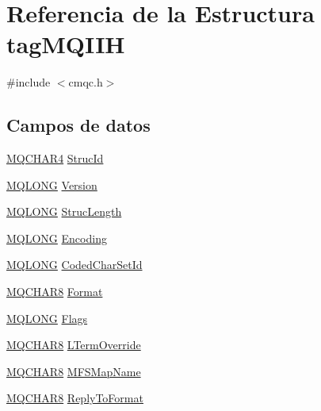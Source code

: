 \hypertarget{structtag_m_q_i_i_h}{}\section{Referencia de la Estructura tag\+M\+Q\+I\+I\+H}
\label{structtag_m_q_i_i_h}


{\ttfamily \#include $<$cmqc.\+h$>$}

\subsection*{Campos de datos}
\begin{DoxyCompactItemize}
\item 
\hyperlink{cmqc_8h_a12590e546ed66fda7cf21c1d5cefa31d}{M\+Q\+C\+H\+A\+R4} \hyperlink{structtag_m_q_i_i_h_a0530922ca944569b52601d74941f96e4}{Struc\+Id}
\item 
\hyperlink{cmqc_8h_a1fb8d28cbda3fa8766a9821230cdb6d5}{M\+Q\+L\+O\+N\+G} \hyperlink{structtag_m_q_i_i_h_a0656ef8f766b3907d394d88a35d7b7e9}{Version}
\item 
\hyperlink{cmqc_8h_a1fb8d28cbda3fa8766a9821230cdb6d5}{M\+Q\+L\+O\+N\+G} \hyperlink{structtag_m_q_i_i_h_a830af9a4a08c015b9a4b2d39d4d3420a}{Struc\+Length}
\item 
\hyperlink{cmqc_8h_a1fb8d28cbda3fa8766a9821230cdb6d5}{M\+Q\+L\+O\+N\+G} \hyperlink{structtag_m_q_i_i_h_a30167bf454a49a60fd3fe4e9e586af34}{Encoding}
\item 
\hyperlink{cmqc_8h_a1fb8d28cbda3fa8766a9821230cdb6d5}{M\+Q\+L\+O\+N\+G} \hyperlink{structtag_m_q_i_i_h_a4d8d1961a991850d1355cdf9b4680b8e}{Coded\+Char\+Set\+Id}
\item 
\hyperlink{cmqc_8h_abddcedb8c41fa262f2bd05dfec3e60a5}{M\+Q\+C\+H\+A\+R8} \hyperlink{structtag_m_q_i_i_h_a435a478822008713f8aaff89f369ed63}{Format}
\item 
\hyperlink{cmqc_8h_a1fb8d28cbda3fa8766a9821230cdb6d5}{M\+Q\+L\+O\+N\+G} \hyperlink{structtag_m_q_i_i_h_a8da770267273b200fa9c968fa2a0da57}{Flags}
\item 
\hyperlink{cmqc_8h_abddcedb8c41fa262f2bd05dfec3e60a5}{M\+Q\+C\+H\+A\+R8} \hyperlink{structtag_m_q_i_i_h_a6234d3d27d3b6ffe0efc51f8bd845f79}{L\+Term\+Override}
\item 
\hyperlink{cmqc_8h_abddcedb8c41fa262f2bd05dfec3e60a5}{M\+Q\+C\+H\+A\+R8} \hyperlink{structtag_m_q_i_i_h_a1737f092f5f03c7344e8d83c8eace01b}{M\+F\+S\+Map\+Name}
\item 
\hyperlink{cmqc_8h_abddcedb8c41fa262f2bd05dfec3e60a5}{M\+Q\+C\+H\+A\+R8} \hyperlink{structtag_m_q_i_i_h_aa0db77dc6a13de85785fa6cde04cb9ec}{Reply\+To\+Format}

\end{DoxyCompactItemize}
